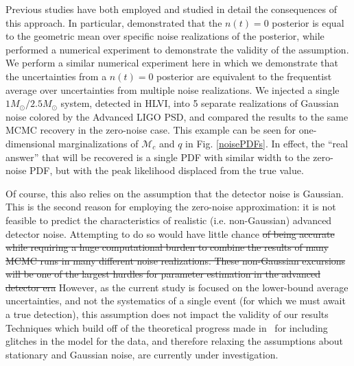 \documentclass[11pt,a4paper]{emulateapj} 
\newcommand{\carl}[1]{{\color{red} #1}}
\newcommand{\chmass}{\mathcal{M}_c}
\begin{document}
     
     Previous studies have both employed and studied in detail the consequences of this approach.
   \carl{  In particular, \cite{Nissanke2010} demonstrated that the $n(t)=0$ posterior is equal to the geometric mean over 
     specific noise realizations of the posterior, while \cite{Sampson2013} performed a numerical experiment to 
     demonstrate the validity of the assumption.  We perform a similar numerical experiment here in which we demonstrate that the uncertainties from a $n(t)=0$ posterior are equivalent to the frequentist
     average over uncertainties from multiple noise realizations. }  We injected a single
$1M_{\odot}/2.5M_{\odot}$ system, detected in HLVI, into 5 separate
realizations of Gaussian noise colored by the Advanced LIGO PSD, and
compared the results to the same MCMC recovery in the zero-noise case.
This example can be seen for one-dimensional marginalizations of
$\chmass$ and $q$ in Fig. \ref{noisePDFs}.  In effect, the ``real
answer'' that will be recovered is a single PDF with similar width to
the zero-noise PDF, but with the peak likelihood displaced from the
true value.
 

  
  

  Of course, this also relies on the assumption that the detector noise is Gaussian.  
  This is the second reason for employing the zero-noise approximation: it is not feasible
to predict the characteristics of realistic (i.e. non-Gaussian)
advanced detector noise.  
Attempting to do so would have little chance
\sout{of being accurate while requiring a huge computational burden to
combine the results of many MCMC runs in many different noise realizations.
These non-Gaussian excursions will be one of the largest hurdles for parameter estimation
in the advanced detector era} \carl{However, as the current study is focused on the lower-bound average uncertainties,
 and not the systematics of a single event (for which we must await a true detection), this assumption does not impact 
 the validity of our results}
Techniques which build
off of the theoretical progress made
in~\cite{Allen:2002jw,Rover:2011qd,Littenberg:2010gf} for including
glitches in the model for the data, and therefore relaxing the
assumptions about stationary and Gaussian noise, are currently under
investigation.
\end{document}
